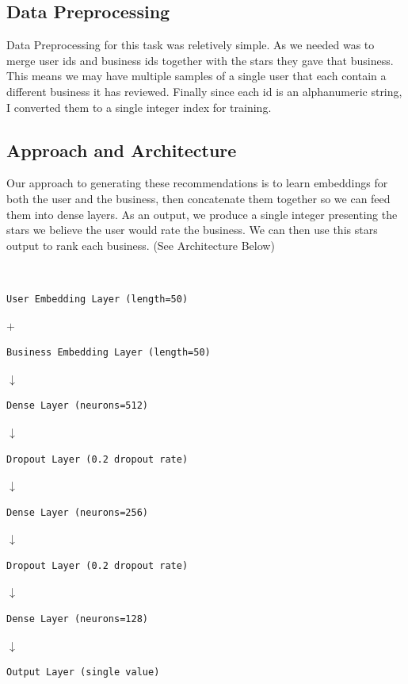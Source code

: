\documentclass{article}
\begin{document}
\subsection*{Data Preprocessing}

Data Preprocessing for this task was reletively simple. As we needed was to merge user ids and business ids together with the stars they gave that business. This means we may have multiple samples of a single user that each contain a different business it has reviewed. Finally since each id is an alphanumeric string, I converted them to a single integer index for training.

\subsection*{Approach and Architecture}

Our approach to generating these recommendations is to learn embeddings for both the user and the business, then concatenate them together so we can feed them into dense layers. As an output, we produce a single integer presenting the stars we believe the user would rate the business. We can then use this stars output to rank each business. (See Architecture Below)

\mbox{}\\
\begin{verbatim}
User Embedding Layer (length=50)
\end{verbatim}
$+$
\begin{verbatim}
Business Embedding Layer (length=50)
\end{verbatim}
$\downarrow$
\begin{verbatim}
Dense Layer (neurons=512)
\end{verbatim}
$\downarrow$
\begin{verbatim}
Dropout Layer (0.2 dropout rate)
\end{verbatim}
$\downarrow$
\begin{verbatim}
Dense Layer (neurons=256)
\end{verbatim}
$\downarrow$
\begin{verbatim}
Dropout Layer (0.2 dropout rate)
\end{verbatim}
$\downarrow$
\begin{verbatim}
Dense Layer (neurons=128)
\end{verbatim}
$\downarrow$
\begin{verbatim}
Output Layer (single value)
\end{verbatim}
\mbox{}\\
\end{document}
